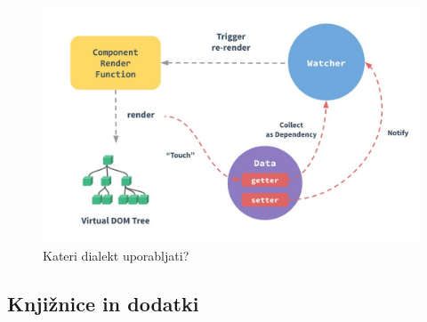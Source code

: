 \documentclass[a4paper, 12pt]{book}
\begin{document}
\begin{figure}[h]
\begin{center}
\includegraphics[width=13cm]{Vue-reactivity.jpg}
\end{center}
\caption{Kateri dialekt uporabljati?}
\label{VueReacitivity}
\end{figure}

\subsection {Knjižnice in dodatki}
\end{document}
